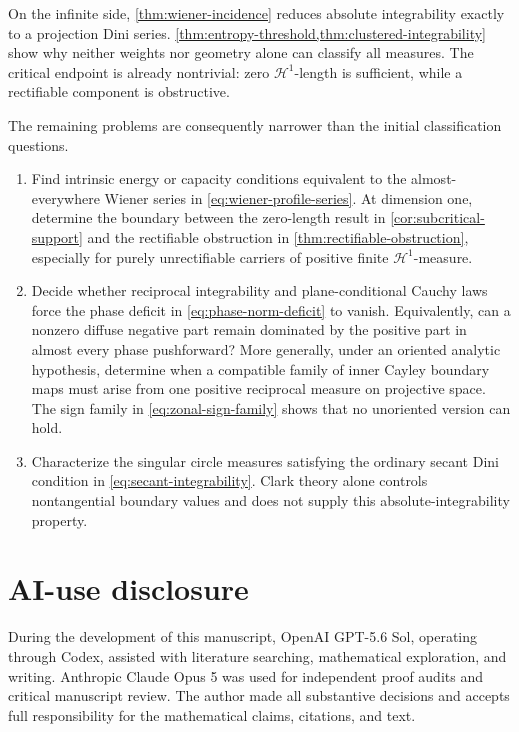 \documentclass[11pt]{article}
\numberwithin{equation}{section}
\theoremstyle{thmstyleone}%
\theoremstyle{thmstyletwo}%
\let\cref\autoref
\newenvironment{acks}[1][Acknowledgments]{\section*{#1}}{\par}
\newcommand{\BetaIncidenceBibliographyStyle}{alpha}
\begin{document}
On the infinite side, \cref{thm:wiener-incidence} reduces absolute
integrability exactly to a projection Dini series.
\cref{thm:entropy-threshold,thm:clustered-integrability} show why neither
weights nor geometry alone can classify all measures.  The critical
endpoint is already nontrivial: zero \(\mathcal H^1\)-length is sufficient,
while a rectifiable component is obstructive.

The remaining problems are consequently narrower than the initial
classification questions.

\begin{enumerate}
\item Find intrinsic energy or capacity conditions equivalent to the
  almost-everywhere Wiener series in
  \cref{eq:wiener-profile-series}.  At dimension one, determine the boundary
  between the zero-length result in \cref{cor:subcritical-support} and the
  rectifiable obstruction in \cref{thm:rectifiable-obstruction}, especially
  for purely unrectifiable carriers of positive finite
  \(\mathcal H^1\)-measure.
\item Decide whether reciprocal integrability and plane-conditional Cauchy
  laws force the phase deficit in \cref{eq:phase-norm-deficit} to vanish.
  Equivalently, can a nonzero diffuse negative part remain dominated by the
  positive part in almost every phase pushforward?  More generally, under an
  oriented analytic hypothesis, determine when a compatible family of inner
  Cayley boundary maps must arise from one positive reciprocal measure on
  projective space.  The sign family in \cref{eq:zonal-sign-family} shows that
  no unoriented version can hold.
\item Characterize the singular circle measures satisfying the ordinary
  secant Dini condition in \cref{eq:secant-integrability}.  Clark theory
  alone controls nontangential boundary values and does not supply this
  absolute-integrability property.
\end{enumerate}

\begin{acks}[AI-use disclosure]
During the development of this manuscript, OpenAI GPT-5.6 Sol, operating
through Codex, assisted with literature searching, mathematical exploration,
and writing.
Anthropic Claude Opus 5 was used for independent proof audits and critical
manuscript review.  The author made all substantive decisions and accepts
full responsibility for the mathematical claims, citations, and text.
\end{acks}



 
\end{document}
